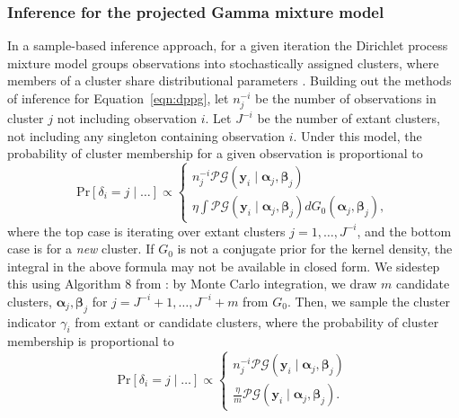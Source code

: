 \subsubsection{Inference for the projected Gamma mixture model}
In a sample-based inference approach, for a given iteration the Dirichlet process mixture model 
    groups observations into stochastically assigned clusters, where members of a cluster share 
    distributional parameters \citep{muller2015,ascolani2022}. Building out the methods of inference for Equation~\eqref{eqn:dppg}, 
    let $n_j^{-i}$ be the number of observations in cluster $j$ not including observation $i$.  Let $J^{-i}$ be 
    the number of extant clusters, not including any singleton containing observation $i$. Under this model, 
    the probability of cluster membership for a given observation is proportional to
\begin{equation*}
    \text{Pr}\left[\delta_i = j\mid\ldots\right] \propto \begin{cases}
        n_j^{-i}\mathcal{PG}\left(\bm{y}_i\mid\bm{\alpha}_j,\bm{\beta}_j\right)\\ %
        \eta\int\mathcal{PG}\left(\bm{y}_i\mid\bm{\alpha}_j,\bm{\beta}_j\right)dG_0(\bm{\alpha}_j,\bm{\beta}_j),%
        \end{cases}
\end{equation*}
where the top case is iterating over extant clusters $j = 1,\ldots, J^{-i}$, and the bottom case is
    for a \emph{new} cluster. If $G_0$ is not a conjugate prior for the kernel density, the integral in the 
    above formula may not be available in closed form. We sidestep this using Algorithm 8 from \cite{neal2000}: 
    by Monte Carlo integration, we draw $m$ candidate clusters, $\bm{\alpha}_j,\bm{\beta}_j$ for
    $j = J^{-i} + 1,\ldots, J^{-i} + m$ from $G_0$. Then, we sample the cluster indicator 
    $\gamma_i$ from extant or candidate clusters, where the probability of cluster membership is proportional to
\begin{equation}
    \text{Pr}\left[\delta_i = j\mid\ldots\right] \propto \begin{cases}
        n_j^{-i}\mathcal{PG}\left(\bm{y}_i\mid\bm{\alpha}_j,\bm{\beta}_j\right)\\ %
        \frac{\eta}{m}\mathcal{PG}\left(\bm{y}_i\mid\bm{\alpha}_j,\bm{\beta}_j\right). %
        \end{cases}
\end{equation}
